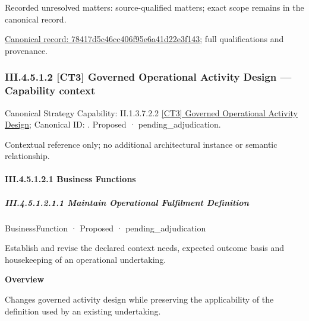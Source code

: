 {\small Recorded unresolved matters: source-qualified matters; exact scope remains in the canonical record.}\par
{\footnotesize \href{../../../../continuum/business/business-function/78417d5c46cc406f95e6a41d22e3f143.md}{Canonical record: 78417d5c46cc406f95e6a41d22e3f143}; full qualifications and provenance.}\par
\subsubsection*{III.4.5.1.2 [CT3] Governed Operational Activity Design — Capability context}
\label{navigation:III.4.5.1.2}

{\small Canonical Strategy Capability: II.1.3.7.2.2 \hyperref[element:3a96040821c14fe38830411dab4f8453]{[CT3] Governed Operational Activity Design}; Canonical ID: \texttt{}. Proposed · pending\_adjudication.}\par
Contextual reference only; no additional architectural instance or semantic relationship.\par
\paragraph*{III.4.5.1.2.1 Business Functions}
\label{navigation:III.4.5.1.2.1}

\subparagraph*{III.4.5.1.2.1.1 Maintain Operational Fulfilment Definition}
\label{navigation:III.4.5.1.2.1.1}

\label{element:9f7085926221436bb672e52e59bca512}
{\small BusinessFunction · Proposed · pending\_adjudication}\par

Establish and revise the declared context needs, expected outcome basis and housekeeping of an operational undertaking.



\textbf{Overview}



Changes governed activity design while preserving the applicability of the definition used by an existing undertaking.



